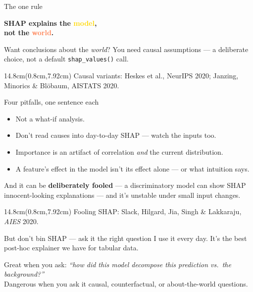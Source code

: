 \documentclass[aspectratio=169,11pt]{beamer}
\newcommand{\srcline}[1]{%
  \begin{textblock*}{14.8cm}(0.8cm,7.92cm)
    \textcolor{muted}{\scriptsize #1}
  \end{textblock*}}
\begin{document}
\begin{frame}{The one rule}
\vfill
\begin{center}
{\fontsize{32}{38}\selectfont\bfseries\textcolor{ink}{SHAP explains the }\textcolor{gold}{model}\textcolor{ink}{,}}\\[6pt]
{\fontsize{32}{38}\selectfont\bfseries\textcolor{ink}{not the }\textcolor{coral}{world}\textcolor{ink}{.}}
\end{center}
\vfill
\large\centering
Want conclusions about the \emph{world}? You need causal assumptions --- a
deliberate choice, not a default \texttt{shap\_values()} call.
\srcline{Causal variants: Heskes et al., NeurIPS 2020; Janzing, Minorics \& Bl\"obaum, AISTATS 2020.}
\vfill
\end{frame}

\begin{frame}{Four pitfalls, one sentence each}
\large
\begin{itemize}
  \item Not a what-if analysis.
  \item Don't read causes into day-to-day SHAP --- watch the inputs too.
  \item Importance is an artifact of correlation \emph{and} the current distribution.
  \item A feature's effect in the model isn't its effect alone --- or what intuition says.
\end{itemize}
\vspace{10pt}
\begin{warnbox}
And it can be \textbf{deliberately fooled} --- a discriminatory model can show SHAP
innocent-looking explanations --- and it's unstable under small input changes.
\end{warnbox}
\srcline{Fooling SHAP: Slack, Hilgard, Jia, Singh \& Lakkaraju, \emph{AIES} 2020.}
\end{frame}

\begin{frame}{But don't bin SHAP --- ask it the right question}
\large
I use it every day. It's the best post-hoc explainer we have for tabular data.\\[14pt]
\begin{rulebox}
Great when you ask: \emph{``how did this model decompose this prediction vs.\ the
background?''}\\[4pt]
Dangerous when you ask it causal, counterfactual, or about-the-world questions.
\end{rulebox}
\end{frame}
\end{document}
